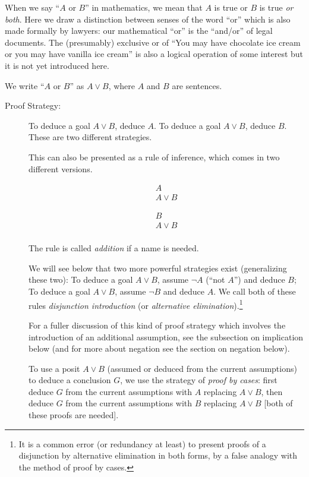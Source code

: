 \documentclass[12pt]{book}
\begin{document}
When we say ``$A$ or $B$'' in mathematics, we mean that $A$ is true or
$B$ is true {\em or both\/}.  Here we draw a distinction between
senses of the word ``or'' which is also made formally by lawyers: our
mathematical ``or'' is the ``and/or'' of legal documents.  The
(presumably) exclusive or of ``You may have chocolate ice cream or you
may have vanilla ice cream'' is also a logical operation of some
interest but it is not yet introduced here.

We write ``$A$ or $B$'' as $A \vee B$, where $A$ and $B$ are sentences.


\begin{description}


\item[Proof Strategy:] To deduce a goal $A \vee B$, deduce $A$.  To
deduce a goal $A \vee B$, deduce $B$.  These are two different
strategies.  

This can also be presented as a rule of inference, which comes in two different versions.

$$\begin{array}{r} A \\ \hline A \vee B \end{array}$$

$$\begin{array}{r} B \\ \hline  A \vee B \\ \end{array}$$

The rule is called {\em addition\/} if a name is needed.

We will see below that two more powerful strategies
exist (generalizing these two): To deduce a goal $A \vee B$, assume
$\neg A$ (``not $A$'') and deduce $B$; To deduce a goal $A \vee B$,
assume $\neg B$ and deduce $A$.  We call both of these rules {\em disjunction introduction\/} (or {\em alternative elimination\/}).\footnote{It is a common error (or redundancy at least) to present proofs of a disjunction by alternative elimination in both forms, by a false analogy with the method of proof by cases.}

For a fuller discussion of this kind of proof strategy which involves
the introduction of an additional assumption, see the subsection on
implication below (and for more about negation see the section on
negation below).

To use a posit $A \vee B$ (assumed or deduced from the current
assumptions) to deduce a conclusion $G$, we use the strategy of {\em
proof by cases\/}: first deduce $G$ from the current assumptions with
$A$ replacing $A \vee B$, then deduce $G$ from the current assumptions
with $B$ replacing $A \vee B$ [both of these proofs are needed].

\end{description}
\end{document}
